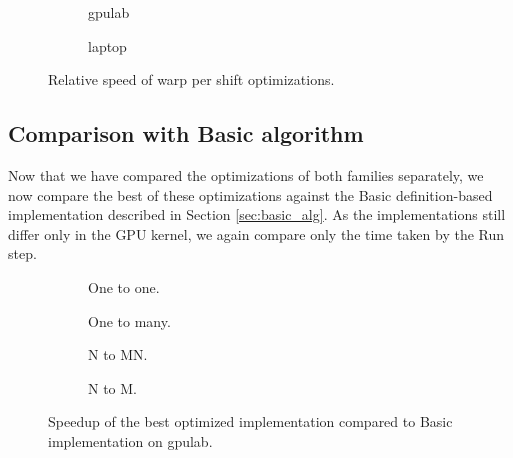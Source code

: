 \begin{figure}[ht]
	\centering	
	\begin{subfigure}{0.4\textwidth}
		\centering
		\def\svgwidth{\textwidth}
		
		\caption{gpulab}
		\label{fig:warp_per_shift_results_gpulab}
	\end{subfigure}
	\begin{subfigure}{0.4\textwidth}
		\centering
		\def\svgwidth{\textwidth}
		
		\caption{laptop}
		\label{fig:warp_per_shift_results_laptop}
	\end{subfigure}
	\caption{Relative speed of warp per shift optimizations.}
	\label{fig:warp_per_shift_results}
\end{figure}

\subsection{Comparison with Basic algorithm}
\label{sec:comparison_with_basic}

Now that we have compared the optimizations of both families separately, we now compare the best of these optimizations against the Basic definition-based implementation described in Section \ref{sec:basic_alg}. As the implementations still differ only in the GPU kernel, we again compare only the time taken by the Run step.


\begin{figure}[ht]
	\centering	
	\begin{subfigure}{0.4\textwidth}
		\centering
		\def\svgwidth{\textwidth}
		
		\caption{One to one.}
		\label{fig:definition_based_speedup_one_to_one}
	\end{subfigure}
	\begin{subfigure}{0.4\textwidth}
		\centering
		\def\svgwidth{\textwidth}
		
		\caption{One to many.}
		\label{fig:definition_based_speedup_one_to_many}
	\end{subfigure}
	\begin{subfigure}{0.4\textwidth}
		\centering
		\def\svgwidth{\textwidth}
		
		\caption{N to MN.}
		\label{fig:definition_based_speedup_n_to_mn}
	\end{subfigure}
	\begin{subfigure}{0.4\textwidth}
		\centering
		\def\svgwidth{\textwidth}
		
		\caption{N to M.}
		\label{fig:definition_based_speedup_n_to_m}
	\end{subfigure}
	\caption{Speedup of the best optimized implementation compared to Basic implementation on gpulab.}
	\label{fig:definition_based_speedup}
\end{figure}

